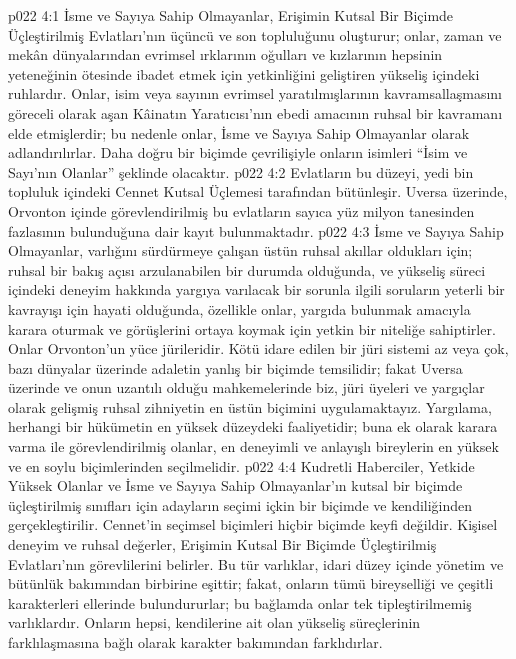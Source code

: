 \vs p022 4:1 İsme ve Sayıya Sahip Olmayanlar, Erişimin Kutsal Bir Biçimde Üçleştirilmiş Evlatları’nın üçüncü ve son topluluğunu oluşturur; onlar, zaman ve mekân dünyalarından evrimsel ırklarının oğulları ve kızlarının hepsinin yeteneğinin ötesinde ibadet etmek için yetkinliğini geliştiren yükseliş içindeki ruhlardır. Onlar, isim veya sayının evrimsel yaratılmışlarının kavramsallaşmasını göreceli olarak aşan Kâinatın Yaratıcısı’nın ebedi amacının ruhsal bir kavramanı elde etmişlerdir; bu nedenle onlar, İsme ve Sayıya Sahip Olmayanlar olarak adlandırılırlar. Daha doğru bir biçimde çevrilişiyle onların isimleri “İsim ve Sayı’nın  Olanlar” şeklinde olacaktır.
\vs p022 4:2 Evlatların bu düzeyi, yedi bin topluluk içindeki Cennet Kutsal Üçlemesi tarafından bütünleşir. Uversa üzerinde, Orvonton içinde görevlendirilmiş bu evlatların sayıca yüz milyon tanesinden fazlasının bulunduğuna dair kayıt bulunmaktadır.
\vs p022 4:3 İsme ve Sayıya Sahip Olmayanlar, varlığını sürdürmeye çalışan üstün ruhsal akıllar oldukları için; ruhsal bir bakış açısı arzulanabilen bir durumda olduğunda, ve yükseliş süreci içindeki deneyim hakkında yargıya varılacak bir sorunla ilgili soruların yeterli bir kavrayışı için hayati olduğunda, özellikle onlar, yargıda bulunmak amacıyla karara oturmak ve görüşlerini ortaya koymak için yetkin bir niteliğe sahiptirler. Onlar Orvonton’un yüce jürileridir. Kötü idare edilen bir jüri sistemi az veya çok, bazı dünyalar üzerinde adaletin yanlış bir biçimde temsilidir; fakat Uversa üzerinde ve onun uzantılı olduğu mahkemelerinde biz, jüri üyeleri ve yargıçlar olarak gelişmiş ruhsal zihniyetin en üstün biçimini uygulamaktayız. Yargılama, herhangi bir hükümetin en yüksek düzeydeki faaliyetidir; buna ek olarak karara varma ile görevlendirilmiş olanlar, en deneyimli ve anlayışlı bireylerin en yüksek ve en soylu biçimlerinden seçilmelidir.
\vs p022 4:4 Kudretli Haberciler, Yetkide Yüksek Olanlar ve İsme ve Sayıya Sahip Olmayanlar’ın kutsal bir biçimde üçleştirilmiş sınıfları için adayların seçimi içkin bir biçimde ve kendiliğinden gerçekleştirilir. Cennet’in seçimsel biçimleri hiçbir biçimde keyfi değildir. Kişisel deneyim ve ruhsal değerler, Erişimin Kutsal Bir Biçimde Üçleştirilmiş Evlatları’nın görevlilerini belirler. Bu tür varlıklar, idari düzey içinde yönetim ve bütünlük bakımından birbirine eşittir; fakat, onların tümü bireyselliği ve çeşitli karakterleri ellerinde bulundururlar; bu bağlamda onlar tek tipleştirilmemiş varlıklardır. Onların hepsi, kendilerine ait olan yükseliş süreçlerinin farklılaşmasına bağlı olarak karakter bakımından farklıdırlar.
